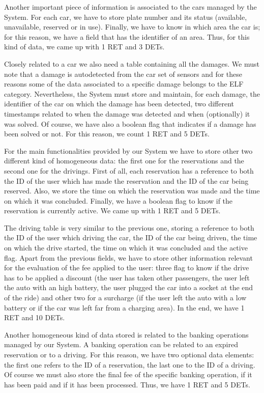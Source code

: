 Another important piece of information is associated to the cars managed by the System. For each car, we have to store plate number and its status (available, unavailable, reserved or in use). Finally, we have to know in which area the car is; for this reason, we have a field that has the identifier of an area. Thus, for this kind of data, we came up with 1 RET and 3 DETs.
\smallskip

Closely related to a car we also need a table containing all the damages. We must note that a damage is autodetected from the car set of sensors and for these reasons some of the data associated to a specific damage belongs to the ELF category. Nevertheless, the System must store and maintain, for each damage, the identifier of the car on which the damage has been detected, two different timestamps related to when the damage was detected and when (optionally) it was solved. Of course, we have also a boolean flag that indicates if a damage has been solved or not. For this reason, we count 1 RET and 5 DETs. 
\smallskip

For the main functionalities provided by our System we have to store other two different kind of homogeneous data: the first one for the reservations and the second one for the drivings.
First of all, each reservation has a reference to both the ID of the user which has made the reservation and the ID of the car being reserved. Also, we store the time on which the reservation was made and the time on which it was concluded. Finally, we have a boolean flag to know if the reservation is currently active.
We came up with 1 RET and 5 DETs.
\smallskip

The driving table is very similar to the previous one, storing a reference to both the ID of the user which driving the car, the ID of the car being driven, the time on which the drive started, the time on which it was concluded and the active flag. Apart from the previous fields, we have to store other information relevant for the evaluation of the fee applied to the user: three flag to know if the drive has to be applied a discount (the user has taken other passengers, the user left the auto with an high battery, the user plugged the car into a socket at the end of the ride) and other two for a surcharge (if the user left the auto with a low battery or if the car was left far from a charging area). In the end, we have 1 RET and 10 DETs.
\smallskip

Another homogeneous kind of data stored is related to the banking operations managed by our System. A banking operation can be related to an expired reservation or to a driving. For this reason, we have two optional data elements: the first one refers to the ID of a reservation, the last one to the ID of a driving. Of course we must also store the final fee of the specific banking operation, if it has been paid and if it has been processed. Thus, we have 1 RET and 5 DETs.
\smallskip

